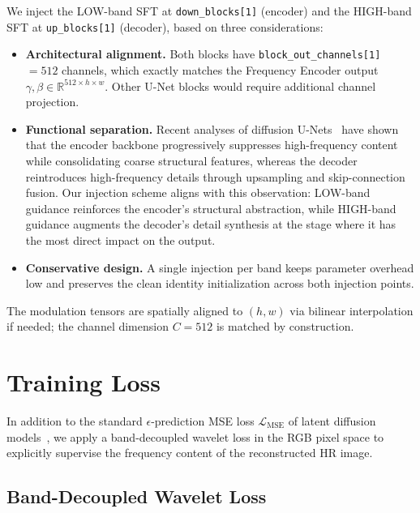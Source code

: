 We inject the LOW-band SFT at \texttt{down\_blocks[1]} (encoder) 
and the HIGH-band SFT at \texttt{up\_blocks[1]} (decoder), based 
on three considerations:
\begin{itemize}
    \item \textbf{Architectural alignment.} Both blocks have 
    \texttt{block\_out\_channels[1]} $= 512$ channels, which 
    exactly matches the Frequency Encoder output 
    $\gamma, \beta \in \mathbb{R}^{512 \times h \times w}$. 
    Other U-Net blocks would require additional channel projection.
    
    \item \textbf{Functional separation.} Recent analyses of 
    diffusion U-Nets~\cite{si2024freeu,choi2022p2} have shown 
    that the encoder backbone progressively suppresses 
    high-frequency content while consolidating coarse structural 
    features, whereas the decoder reintroduces high-frequency 
    details through upsampling and skip-connection fusion. Our 
    injection scheme aligns with this observation: LOW-band 
    guidance reinforces the encoder's structural abstraction, 
    while HIGH-band guidance augments the decoder's detail 
    synthesis at the stage where it has the most direct impact 
    on the output.
    
    \item \textbf{Conservative design.} A single injection per 
    band keeps parameter overhead low and preserves the clean 
    identity initialization across both injection points.
\end{itemize}
The modulation tensors are spatially aligned to $(h, w)$ via 
bilinear interpolation if needed; the channel dimension $C = 512$ 
is matched by construction.



\section{Training Loss}
\label{sec:training_objective}

In addition to the standard $\epsilon$-prediction MSE loss 
$\mathcal{L}_{\mathrm{MSE}}$ of latent diffusion 
models~\cite{ho2020ddpm,rombach2022ldm}, we apply a band-decoupled 
wavelet loss in the RGB pixel space to explicitly supervise the 
frequency content of the reconstructed HR image.

\subsection{Band-Decoupled Wavelet Loss}
\label{subsec:wavelet_loss}

